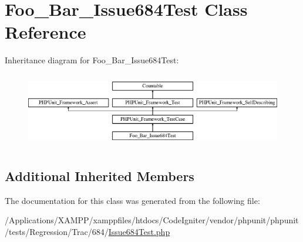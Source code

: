 \hypertarget{class_foo___bar___issue684_test}{}\section{Foo\+\_\+\+Bar\+\_\+\+Issue684\+Test Class Reference}
\label{class_foo___bar___issue684_test}
Inheritance diagram for Foo\+\_\+\+Bar\+\_\+\+Issue684\+Test\+:\begin{figure}[H]
\begin{center}
\leavevmode
\includegraphics[height=3.303835cm]{class_foo___bar___issue684_test}
\end{center}
\end{figure}
\subsection*{Additional Inherited Members}


The documentation for this class was generated from the following file\+:\begin{DoxyCompactItemize}
\item 
/\+Applications/\+X\+A\+M\+P\+P/xamppfiles/htdocs/\+Code\+Igniter/vendor/phpunit/phpunit/tests/\+Regression/\+Trac/684/\mbox{\hyperlink{_issue684_test_8php}{Issue684\+Test.\+php}}\end{DoxyCompactItemize}
